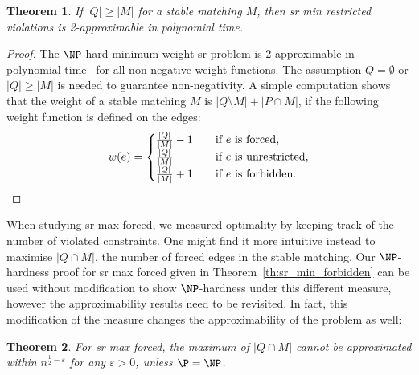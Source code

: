 \documentclass[preprint,12pt]{elsarticle}
\newtheorem{theorem}{Theorem}[section]
\begin{document}
\begin{theorem}
\label{th:2appr}
	If $|Q| \geq |M|$ for a stable matching $M$, then {\sc sr min restricted violations} is 2-approximable in polynomial time.
\end{theorem}

\begin{proof}
	The $\NP$-hard minimum weight {\sc sr} problem is 2-approximable in polynomial time~\cite{Fed92,TS98} for all non-negative weight functions. The assumption  $Q = \emptyset$ or $|Q| \geq |M|$ is needed to guarantee non-negativity. A simple computation shows that the weight of a stable matching $M$ is $|Q \setminus M| + |P \cap M|$, if the following weight function is defined on the edges:
	\[   
w(e) = 
     \begin{cases}
       \frac{|Q|}{|M|} -1 &\quad\text{if }e\text{ is forced},\\
       \frac{|Q|}{|M|} &\quad\text{if }e\text{ is unrestricted},\\ 
       \frac{|Q|}{|M|} +1 &\quad\text{if }e\text{ is forbidden}.
     \end{cases}\vspace{-5mm}
\]\end{proof}
\fi

When studying {\sc sr max forced}, we measured optimality by keeping track of the number of violated constraints. One might find it more intuitive instead to maximise $|Q \cap M|$, the number of forced edges in the stable matching. Our $\NP$-hardness proof for {\sc sr max forced} given in Theorem~\ref{th:sr_min_forbidden} can be used without modification to show $\NP$-hardness under this different measure, however the  approximability results need to be revisited. In fact, this modification of the measure changes the approximability of the problem as well:

\begin{theorem}
\label{th:sr_max_forced_inappr}
For {\sc sr max forced}, the maximum of $|Q \cap M|$ cannot be approximated within $n^{\frac{1}{2}-\varepsilon}$ for any $\varepsilon > 0$, unless $\P = \NP$.
\end{theorem}
\end{document}
